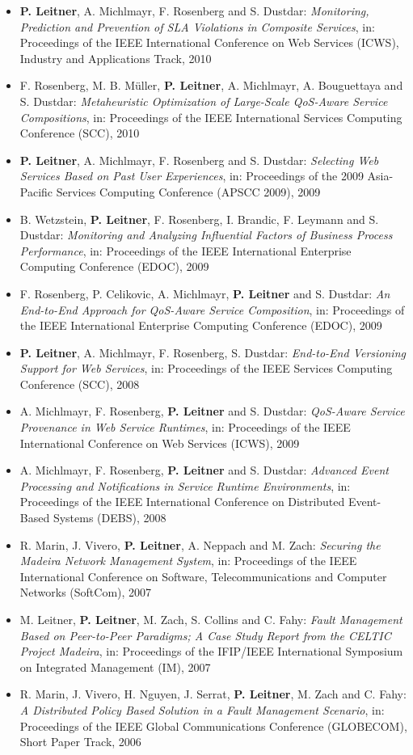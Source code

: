 \documentclass[paper=letter,fontsize=11pt]{scrartcl} %
\begin{document}
\begin{itemize}
\begin{shaded}
  \end{shaded}
\item \textbf{P. Leitner}, A. Michlmayr, F. Rosenberg and S. Dustdar: \emph{Monitoring, Prediction and Prevention of SLA Violations in Composite Services}, in: Proceedings of the IEEE International Conference on Web Services (ICWS), Industry and Applications Track, 2010
\item F. Rosenberg, M. B. M\"uller, \textbf{P. Leitner}, A. Michlmayr, A. Bouguettaya
and S. Dustdar: \emph{Metaheuristic Optimization of Large-Scale QoS-Aware Service Compositions}, in: Proceedings of the IEEE International Services Computing Conference (SCC), 2010
\item \textbf{P. Leitner}, A. Michlmayr, F. Rosenberg and S. Dustdar: \emph{Selecting Web Services Based on Past User Experiences}, in: Proceedings of the 2009 Asia-Pacific Services Computing Conference (APSCC 2009), 2009
\item B. Wetzstein, \textbf{P. Leitner}, F. Rosenberg, I. Brandic, F. Leymann and S. Dustdar: \emph{Monitoring and Analyzing Influential Factors of Business Process Performance}, in: Proceedings of the IEEE International Enterprise Computing Conference (EDOC), 2009
\item F. Rosenberg, P. Celikovic, A. Michlmayr, \textbf{P. Leitner} and S. Dustdar: \emph{An End-to-End Approach for QoS-Aware Service Composition}, in: Proceedings of the IEEE International Enterprise Computing Conference (EDOC), 2009
\item \textbf{P. Leitner}, A. Michlmayr, F. Rosenberg, S. Dustdar: \emph{End-to-End Versioning Support for Web Services}, in: Proceedings of the IEEE Services Computing Conference (SCC), 2008
\item A. Michlmayr, F. Rosenberg, \textbf{P. Leitner} and S. Dustdar: \emph{QoS-Aware Service Provenance in Web Service Runtimes}, in: Proceedings of the IEEE International Conference on Web Services (ICWS), 2009
\item A. Michlmayr, F. Rosenberg, \textbf{P. Leitner} and S. Dustdar: \emph{Advanced Event Processing and Notifications in Service Runtime Environments}, in: Proceedings of the IEEE International Conference on Distributed Event-Based Systems (DEBS), 2008
\item R. Marin, J. Vivero, \textbf{P. Leitner}, A. Neppach and M. Zach: \emph{Securing the Madeira Network Management System}, in: Proceedings of the IEEE International Conference on Software, Telecommunications and Computer Networks (SoftCom), 2007
\item M. Leitner, \textbf{P. Leitner}, M. Zach, S. Collins and C. Fahy: \emph{Fault
Management Based on Peer-to-Peer Paradigms; A Case Study Report from the CELTIC
Project Madeira}, in: Proceedings of the IFIP/IEEE International Symposium on Integrated
Management (IM), 2007
\item R. Marin, J. Vivero, H. Nguyen, J. Serrat, \textbf{P. Leitner}, M. Zach and C. Fahy: \emph{A Distributed Policy Based Solution in a Fault Management Scenario}, in: Proceedings of the IEEE Global Communications Conference (GLOBECOM), Short Paper Track, 2006
\end{itemize}
\end{document}
